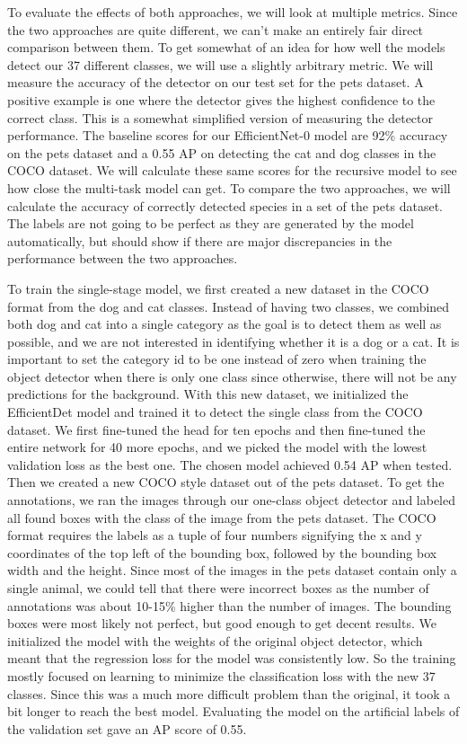 To evaluate the effects of both approaches, we will look at multiple metrics.
Since the two approaches are quite different, we can't make an entirely fair direct comparison between them.
To get somewhat of an idea for how well the models detect our 37 different classes, we will use a slightly arbitrary metric.
We will measure the accuracy of the detector on our test set for the pets dataset.
A positive example is one where the detector gives the highest confidence to the correct class.
This is a somewhat simplified version of measuring the detector performance.
The baseline scores for our EfficientNet-0 model are 92\% accuracy on the pets dataset and a 0.55 AP on detecting the cat and dog classes in the COCO dataset.
We will calculate these same scores for the recursive model to see how close the multi-task model can get.
To compare the two approaches, we will calculate the accuracy of correctly detected species in a set of the pets dataset.
The labels are not going to be perfect as they are generated by the model automatically, but should show if there are major discrepancies in the performance between the two approaches.

To train the single-stage model, we first created a new dataset in the COCO format from the dog and cat classes.
Instead of having two classes, we combined both dog and cat into a single category as the goal is to detect them as well as possible, and we are not interested in identifying whether it is a dog or a cat.
It is important to set the category id to be one instead of zero when training the object detector when there is only one class since otherwise, there will not be any predictions for the background.
With this new dataset, we initialized the EfficientDet model and trained it to detect the single class from the COCO dataset.
We first fine-tuned the head for ten epochs and then fine-tuned the entire network for 40 more epochs, and we picked the model with the lowest validation loss as the best one.
The chosen model achieved 0.54 AP when tested.
Then we created a new COCO style dataset out of the pets dataset.
To get the annotations, we ran the images through our one-class object detector and labeled all found boxes with the class of the image from the pets dataset.
The COCO format requires the labels as a tuple of four numbers signifying the x and y coordinates of the top left of the bounding box, followed by the bounding box width and the height.
Since most of the images in the pets dataset contain only a single animal, we could tell that there were incorrect boxes as the number of annotations was about 10-15\% higher than the number of images.
The bounding boxes were most likely not perfect, but good enough to get decent results.
We initialized the model with the weights of the original object detector, which meant that the regression loss for the model was consistently low.
So the training mostly focused on learning to minimize the classification loss with the new 37 classes.
Since this was a much more difficult problem than the original, it took a bit longer to reach the best model.
Evaluating the model on the artificial labels of the validation set gave an AP score of 0.55.

